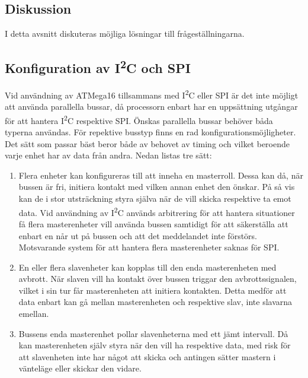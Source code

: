 \documentclass[11pt]{article}
\begin{document}
\begin{flushleft}
\pagebreak

\section{Diskussion}
I detta avsnitt diskuteras möjliga lösningar till frågeställningarna.

\subsection{Konfiguration av I\textsuperscript{2}C och SPI}

Vid användning av ATMega16 tillsammans med I\textsuperscript{2}C eller SPI är det inte möjligt att använda parallella bussar, då processorn enbart har en uppsättning utgångar för att hantera I\textsuperscript{2}C respektive SPI. Önskas parallella bussar behöver båda typerna användas. För repektive busstyp finns en rad konfigurationsmöjligheter. Det sätt som passar bäst beror både av behovet av timing och vilket beroende varje enhet har av data från andra. Nedan listas tre sätt:

\begin{enumerate}
 \item Flera enheter kan konfigureras till att inneha en masterroll. Dessa kan då, när bussen är fri, initiera kontakt med vilken annan enhet den önskar. På så vis kan de i stor utsträckning styra själva när de vill skicka respektive ta emot data. Vid användning av I\textsuperscript{2}C används arbitrering för att hantera situationer få flera masterenheter vill använda bussen samtidigt för att säkerställa att enbart en når ut på bussen och att det meddelandet inte förstörs. \cite{guideI2C} Motsvarande system för att hantera flera masterenheter saknas för SPI.
 
 \item En eller flera slavenheter kan kopplas till den enda masterenheten med avbrott. När slaven vill ha kontakt över bussen triggar den avbrottssignalen, vilket i sin tur får masterenheten att initiera kontakten. Detta medför att data enbart kan gå mellan masterenheten och respektive slav, inte slavarna emellan.
 
 \item Bussens enda masterenhet pollar slavenheterna med ett jämt intervall. Då kan masterenheten själv styra när den vill ha respektive  data, med risk för att slavenheten inte har något att skicka och antingen sätter mastern i vänteläge eller skickar den vidare.
\end{enumerate}


\end{flushleft}
\end{document}
